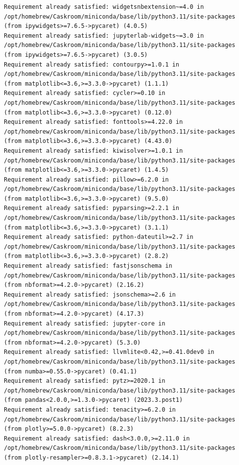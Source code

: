 \documentclass[
  letterpaper,
  DIV=11,
  numbers=noendperiod]{scrartcl}
\begin{document}
\begin{verbatim}
Requirement already satisfied: widgetsnbextension~=4.0 in /opt/homebrew/Caskroom/miniconda/base/lib/python3.11/site-packages (from ipywidgets>=7.6.5->pycaret) (4.0.5)
Requirement already satisfied: jupyterlab-widgets~=3.0 in /opt/homebrew/Caskroom/miniconda/base/lib/python3.11/site-packages (from ipywidgets>=7.6.5->pycaret) (3.0.5)
Requirement already satisfied: contourpy>=1.0.1 in /opt/homebrew/Caskroom/miniconda/base/lib/python3.11/site-packages (from matplotlib<=3.6,>=3.3.0->pycaret) (1.1.1)
Requirement already satisfied: cycler>=0.10 in /opt/homebrew/Caskroom/miniconda/base/lib/python3.11/site-packages (from matplotlib<=3.6,>=3.3.0->pycaret) (0.12.0)
Requirement already satisfied: fonttools>=4.22.0 in /opt/homebrew/Caskroom/miniconda/base/lib/python3.11/site-packages (from matplotlib<=3.6,>=3.3.0->pycaret) (4.43.0)
Requirement already satisfied: kiwisolver>=1.0.1 in /opt/homebrew/Caskroom/miniconda/base/lib/python3.11/site-packages (from matplotlib<=3.6,>=3.3.0->pycaret) (1.4.5)
Requirement already satisfied: pillow>=6.2.0 in /opt/homebrew/Caskroom/miniconda/base/lib/python3.11/site-packages (from matplotlib<=3.6,>=3.3.0->pycaret) (9.5.0)
Requirement already satisfied: pyparsing>=2.2.1 in /opt/homebrew/Caskroom/miniconda/base/lib/python3.11/site-packages (from matplotlib<=3.6,>=3.3.0->pycaret) (3.1.1)
Requirement already satisfied: python-dateutil>=2.7 in /opt/homebrew/Caskroom/miniconda/base/lib/python3.11/site-packages (from matplotlib<=3.6,>=3.3.0->pycaret) (2.8.2)
Requirement already satisfied: fastjsonschema in /opt/homebrew/Caskroom/miniconda/base/lib/python3.11/site-packages (from nbformat>=4.2.0->pycaret) (2.16.2)
Requirement already satisfied: jsonschema>=2.6 in /opt/homebrew/Caskroom/miniconda/base/lib/python3.11/site-packages (from nbformat>=4.2.0->pycaret) (4.17.3)
Requirement already satisfied: jupyter-core in /opt/homebrew/Caskroom/miniconda/base/lib/python3.11/site-packages (from nbformat>=4.2.0->pycaret) (5.3.0)
Requirement already satisfied: llvmlite<0.42,>=0.41.0dev0 in /opt/homebrew/Caskroom/miniconda/base/lib/python3.11/site-packages (from numba>=0.55.0->pycaret) (0.41.1)
Requirement already satisfied: pytz>=2020.1 in /opt/homebrew/Caskroom/miniconda/base/lib/python3.11/site-packages (from pandas<2.0.0,>=1.3.0->pycaret) (2023.3.post1)
Requirement already satisfied: tenacity>=6.2.0 in /opt/homebrew/Caskroom/miniconda/base/lib/python3.11/site-packages (from plotly>=5.0.0->pycaret) (8.2.3)
Requirement already satisfied: dash<3.0.0,>=2.11.0 in /opt/homebrew/Caskroom/miniconda/base/lib/python3.11/site-packages (from plotly-resampler>=0.8.3.1->pycaret) (2.14.1)

\end{verbatim}
\end{document}
